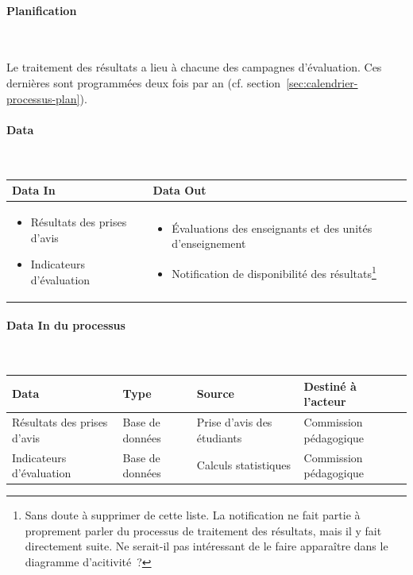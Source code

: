 \documentclass[a4paper,11pt]{report}
\begin{document}
\paragraph{Planification}~\newline{}

Le traitement des résultats a lieu à chacune des campagnes d'évaluation.
Ces dernières sont programmées deux fois par an (cf. section~\ref{sec:calendrier-processus-plan}).

\paragraph{Data}~\newline{}

\begin{tabularx}{\linewidth}{|X|X|} \hline
Data In & Data Out \\ \hline
\begin{itemize}
	\item Résultats des prises d'avis
	\item Indicateurs d'évaluation\newline{}
\end{itemize}
 & 
\begin{itemize}
	\item Évaluations des enseignants et des unités d'enseignement
	\item Notification de disponibilité des résultats\footnote{Sans doute à supprimer de cette liste. La notification ne fait partie à proprement parler du processus de traitement des résultats, mais il y fait directement suite. Ne serait-il pas intéressant de le faire apparaître dans le diagramme d'acitivité~?}\newline{}
\end{itemize}
\\ \hline
\end{tabularx}

\paragraph{Data In du processus}~\newline{}

\begin{tabularx}{\linewidth}{|X|X|X|X|} \hline
Data & Type & Source & Destiné à l'acteur \\ \hline
Résultats des prises d'avis & Base de données & Prise d'avis des étudiants & Commission pédagogique \\
Indicateurs d'évaluation & Base de données & Calculs statistiques & Commission pédagogique \\ \hline
\end{tabularx}
\end{document}
